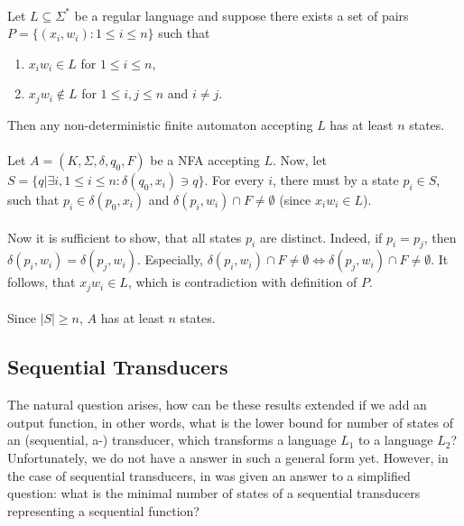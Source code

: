 \paragraph{}
\cveta Let $L \subseteq \Sigma ^{*}$ be a regular language and suppose there exists a set of pairs $P=\{ (x_{i}, w_{i}): 1 \leq i \leq n\} $ such that
\begin{enumerate}
\item $x_{i}w_{i} \in L$ for $1 \leq i \leq n$,
\item $x_{j}w_{i} \notin L$ for $1 \leq i,j \leq n$ and $i \neq j$.
\end{enumerate}
Then any non-deterministic finite automaton accepting $L$ has at least $n$ states.

\paragraph{}
\dokaz Let $A=(K, \Sigma, \delta, q_{0}, F)$ be a NFA accepting $L$. Now, let $S = \{ q | \exists i, 1\leq i \leq n: \delta (q_{0}, x_{i}) \ni q \} $. For every $i$, there must by a state $p_{i} \in S$, such that $p_{i} \in \delta (p_{0}, x_{i})$ and $\delta (p_{i}, w_{i}) \cap F \neq \emptyset $ (since $x_{i}w_{i} \in L$).

\paragraph{}
Now it is sufficient to show, that all states $p_{i}$ are distinct. Indeed, if $p_{i} = p_{j}$, then $\delta (p_{i}, w_{i}) = \delta (p_{j}, w_{i})$. Especially, $\delta (p_{i}, w_{i}) \cap F \neq \emptyset \Leftrightarrow \delta (p_{j}, w_{i}) \cap F\neq \emptyset $. It follows, that $x_{j}w_{i} \in L$, which is contradiction with definition of $P$.

\paragraph{}
Since $|S| \geq n$, $A$ has at least $n$ states. \square

\subsection{Sequential Transducers}
The natural question arises, how can be these results extended if we add an output function, in other words, what is the lower bound for number of states of an (sequential, a-) transducer, which transforms a language $L_{1}$ to a language $L_{2}$? Unfortunately, we do not have a answer in such a general form yet. However, in the case of sequential transducers, in \cite{moh:min} was given an answer to a simplified question: what is the minimal number of states of a sequential transducers representing a sequential function?

